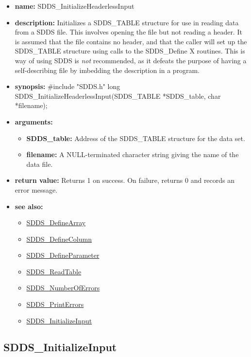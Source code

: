 \documentclass[11pt]{article}
\newcommand{\progref}[1]{\hyperref{SDDS_#1}{{\tt SDDS\_#1} (}{)}{SDDS_#1}}
\begin{document}
\begin{itemize}
\item {\bf name:}\newline
SDDS\_InitializeHeaderlessInput
\item {\bf description:}\newline
Initializes a SDDS\_TABLE structure for use in reading data from a SDDS file. This involves opening the file but not reading a header. It is assumed that the file contains no header, and that the caller will set up the SDDS\_TABLE structure using calls to the SDDS\_Define X routines. This is way of using SDDS is {\em not} recommended, as it defeats the purpose of having a self-describing file by imbedding the description in a program.
\item {\bf synopsis:} \#include "SDDS.h"\newline
long SDDS\_InitializeHeaderlessInput(SDDS\_TABLE *SDDS\_table, char *filename);
\item {\bf arguments:}
\begin{itemize}
\item {\bf SDDS\_table:} Address of the SDDS\_TABLE structure for the data set.
\item {\bf filename:} A NULL-terminated character string giving the name of the data file.
\end{itemize}
\item {\bf return value:}\newline
Returns 1 on success. On failure, returns 0 and records an error message.
\item {\bf see also:}
\begin{itemize}
\item \progref{DefineArray}
\item \progref{DefineColumn}
\item \progref{DefineParameter}
\item \progref{ReadTable}
\item \progref{NumberOfErrors}
\item \progref{PrintErrors}
\item \progref{InitializeInput}
\end{itemize}
\end{itemize}

\subsection{SDDS\_InitializeInput}
\label{SDDS_InitializeInput}
\end{document}
